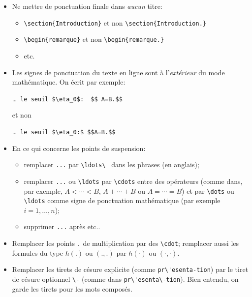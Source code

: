 \documentclass[11pt,francais]{smfart}
\begin{document}
\begin{itemize}
\item
Ne mettre de ponctuation finale dans \emph{aucun} titre:
\begin{itemize}
\item
\verb|\section{Introduction}| et non \verb|\section{Introduction.}|
\item
\verb|\begin{remarque}| et non \verb|\begin{remarque.}|
\item etc.
\end{itemize}

\item
Les signes de ponctuation du texte en ligne sont \`a l'\emph{ext\'erieur} du mode math\'ematique.
On \'ecrit par exemple:

\og\dots\ \verb|le seuil $\eta_0$:  $$ A=B.$$|\fg

\noindent et non

\og\dots\ \verb|le seuil $\eta_0:$ $$A=B.$$|\fg

\item
En ce qui concerne les points de suspension:
\begin{itemize}
\item
remplacer \verb|...| par \verb|\ldots\ | dans les phrases (en anglais);
\item
remplacer \verb|...| ou \verb|\ldots| par \verb|\cdots|
entre des op\'erateurs (comme dans, par exemple,
$A<\cdots<B$, $A+\cdots+B$ ou $A=\cdots=B$)
et par \verb|\dots| ou \verb|\ldots| comme signe de ponctuation
math\'ematique (par exemple $i=1, \dots ,n$);
\item
supprimer \verb|...| apr\`es \og etc.\fg.
\end{itemize}
\item
Remplacer les points \verb|.| de multiplication par des \verb|\cdot|;
remplacer aussi les formules du type $h(.)$ ou $(.,.)$ par $h(\cdot)$ ou
$(\cdot,\cdot)$.

\item
Remplacer les tirets de c\'esure explicite (comme \verb|pr\'esenta-tion|)
par le tiret de c\'esure optionnel \verb|\-|
(comme dans \verb|pr\'esenta\-tion|).
Bien entendu, on garde les tirets pour les mots compos\'es.
\end{itemize}
\end{document}
